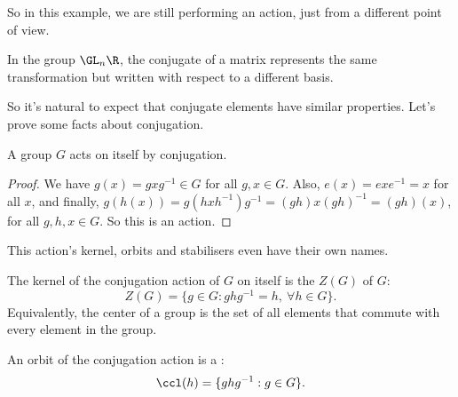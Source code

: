 \documentclass[a4paper]{scrartcl}
\begin{document}
\begin{example}
\begin{center}

	\end{center}
	So in this example, we are still performing an action, just from a different point of view.
\end{example}

\begin{example}
	In the group $\GL_n \R$, the conjugate of a matrix represents the same transformation but written with respect to a different basis.
\end{example}

So it's natural to expect that conjugate elements have similar properties. Let's prove some facts about conjugation.

\begin{proposition}
	A group $G$ acts on itself by conjugation.
\end{proposition}
\begin{proof}
	We have $g(x) = gxg^{-1} \in G$ for all $g, x \in G$. Also, $e(x) = e x e^{-1} = x$ for all $x$, and finally, $g(h(x)) = g(h xh^{-1})g^{-1} = (gh) x (gh)^{-1} = (gh)(x)$, for all $g, h, x \in G$. So this is an action.
\end{proof}

This action's kernel, orbits and stabilisers even have their own names.

\begin{definition}[Center]
	The kernel of the conjugation action of $G$ on itself is the  $Z(G)$ of $G$:
	$$
Z(G) = \{g \in G : ghg^{-1} = h, \ \forall h \in G\}.
	$$
	Equivalently, the center of a group is the set of all elements that commute with every element in the group.
\end{definition}
\begin{definition}
	An orbit of the conjugation action is a :
	$$
\ccl(h) = \{ ghg^{-1} : g \in G \}.
	$$
\end{definition}
\end{document}
